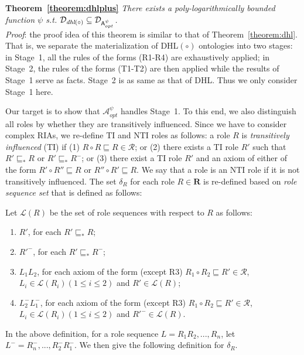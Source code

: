 \textbf{Theorem~\ref{theorem:dhlplus}}
\emph{There exists a poly-logarithmically bounded function $\psi$ s.t. $\mathcal{D}_{\textit{\text{dhl}}(\circ)}\subseteq\mathcal{D}_{\mathsf{A}_{opt}^{\psi}}$.}\\

\noindent\emph{Proof}: the proof idea of this theorem is similar to that of Theorem~\ref{theorem:dhl}.
That is, we separate the materialization of DHL$(\circ)$ ontologies into two stages: in Stage~1,
all the rules of the forms (R1-R4) are exhaustively applied; in Stage~2, the rules of the forms (T1-T2)
are then applied while the results of Stage~1 serve as facts. Stage~2 is as same as that of DHL.
Thus we only consider Stage~1 here.

Our target is to show that $\mathcal{A}_{opt}^\psi$ handles Stage~1. To this end, we also
distinguish all roles by whether they are transitively influenced. Since we have to consider
complex RIAs, we re-define TI and NTI roles as follows:
a role $R$ is \emph{transitively influenced} (TI)
if (1) $R\circ R\sqsubseteq R\in\mathcal{R}$; or
(2) there exists a TI role $R'$ such that $R'\sqsubseteq_*R$ or $R'\sqsubseteq_*R^-$;
or (3) there exist a TI role $R'$ and an axiom of either of the form
$R'\circ R''\sqsubseteq R$ or $R''\circ R'\sqsubseteq R$.
We say that a role is an NTI role if it is not transitively influenced.
The set $\delta_R$ for each role $R\in\textbf{R}$ is re-defined based on \emph{role sequence set}
that is defined as follows:

\begin{definition}\label{def:language}
Let $\mathcal{L}(R)$ be the set of role sequences with respect to $R$ as follows:
 \begin{enumerate}[leftmargin=4ex,label=\arabic*.]
\item $R'$, for each $R'\sqsubseteq_* R$;
\item $R'^-$, for each $R'\sqsubseteq_* R^-$;
\item $L_1L_2$, for each axiom of the form (except R3) $R_1\circ R_2\sqsubseteq R'\in\mathcal{R}$, $L_i\in\mathcal{L}(R_i)(1\leq i\leq 2)$ and $R'\in\mathcal{L}(R)$;
\item $L_2^-L_1^-$, for each axiom of the form (except R3) $R_1\circ R_2\sqsubseteq R'\in\mathcal{R}$, $L_i\in\mathcal{L}(R_i)(1\leq i\leq 2)$ and $R'^-\in\mathcal{L}(R)$.
\end{enumerate}
\end{definition}

In the above definition, for a role sequence $L=R_1R_2,...,R_n$, let $L^-=R_n^-,...,R_2^-R_1^-$.
We then give the following definition for $\delta_R$.

